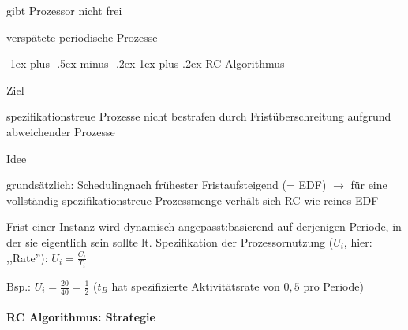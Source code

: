 \documentclass[a4paper]{article}
\makeatletter
\renewcommand{\subsubsection}{\@startsection{subsubsection}{3}{0mm}%
 {-1ex plus -.5ex minus -.2ex}%
 {1ex plus .2ex}%
 {\normalfont\small\bfseries}}
\makeatother
\begin{document}
\begin{multicols}{3}
    \begin{itemize*}
        \item
        gibt Prozessor nicht frei
        \item
        verspätete periodische Prozesse
    \end{itemize*}


    \subsubsection{RC Algorithmus}

    \begin{itemize*}
        \item
        Ziel
        \begin{itemize*}
            \item spezifikationstreue Prozesse nicht bestrafen durch Fristüberschreitung aufgrund abweichender Prozesse
        \end{itemize*}
        \item
        Idee
        \begin{itemize*}
            \item grundsätzlich: Schedulingnach frühester Fristaufsteigend (= EDF) $\rightarrow$ für eine vollständig spezifikationstreue Prozessmenge verhält sich RC wie reines EDF
            \item Frist einer Instanz wird dynamisch angepasst:basierend auf derjenigen Periode, in der sie eigentlich sein sollte lt. Spezifikation der Prozessornutzung ($U_i$, hier: ,,Rate''): $U_i=\frac{C_i}{T_i}$
            \item Bsp.: $U_i =\frac{20}{40}=\frac{1}{2}$ ($t_B$ hat spezifizierte Aktivitätsrate von $0,5$ pro Periode)
        \end{itemize*}
    \end{itemize*}


    \paragraph{RC Algorithmus: Strategie}


\end{multicols}
\end{document}
